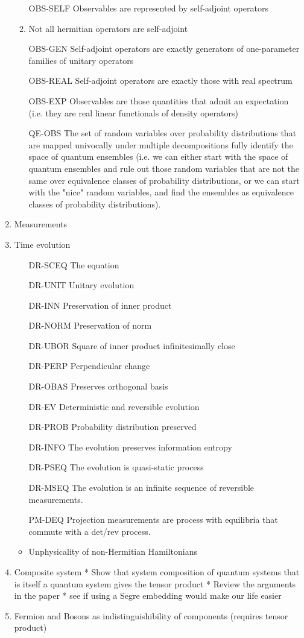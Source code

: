 \begin{enumerate}
\begin{enumerate}
		\item[OBS-SELF] Observables are represented by self-adjoint operators
		\item Not all hermitian operators are self-adjoint
		\item[OBS-GEN] Self-adjoint operators are exactly generators of one-parameter families of unitary operators
		\item[OBS-REAL] Self-adjoint operators are exactly those with real spectrum
		\item[OBS-EXP] Observables are those quantities that admit an expectation (i.e. they are real linear functionals of density operators)
		\item[QE-OBS] The set of random variables over probability distributions that are mapped univocally under multiple decompositions fully identify the space of quantum ensembles (i.e. we can either start with the space of quantum ensembles and rule out those random variables that are not the same over equivalence classes of probability distributions, or we can start with the "nice" random variables, and find the ensembles as equivalence classes of probability distributions).
	\end{enumerate}
	\item Measurements
	\item Time evolution
\begin{itemize}
	\item[DR-SCEQ] The equation
	\item[DR-UNIT] Unitary evolution
	\item[DR-INN] Preservation of inner product
	\item[DR-NORM] Preservation of norm
	\item[DR-UBOR] Square of inner product infinitesimally close
	\item[DR-PERP] Perpendicular change
	\item[DR-OBAS] Preserves orthogonal basis
	\item[DR-EV] Deterministic and reversible evolution
	\item[DR-PROB] Probability distribution preserved
	\item[DR-INFO] The evolution preserves information entropy
	\item[DR-PSEQ] The evolution is quasi-static process
\item[DR-MSEQ] The evolution is an infinite sequence of reversible measurements.
\item[PM-DEQ] Projection measurements are process with equilibria that commute with a det/rev process.
	\item Unphysicality of non-Hermitian Hamiltonians
\end{itemize}
	\item Composite system
	* Show that system composition of quantum systems that is itself a quantum system gives the tensor product
	* Review the arguments in the paper
	* see if using a Segre embedding would make our life easier
	
	\item Fermion and Bosons as indistinguishibility of components (requires tensor product)
\end{enumerate}


